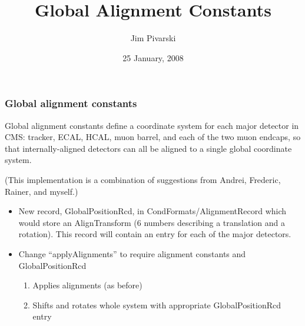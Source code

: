 \documentclass[compress]{beamer}
\title{Global Alignment Constants}
\author{Jim Pivarski}
\institute{Texas A\&M University}
\date{25 January, 2008}
\begin{document}
\frame{\titlepage}


\begin{frame}
\frametitle{Global alignment constants}

Global alignment constants define a coordinate system for each major
detector in CMS: tracker, ECAL, HCAL, muon barrel, and each of the two
muon endcaps, so that internally-aligned detectors can all be aligned
to a single global coordinate system.

\vfill
(This implementation is a combination of suggestions from Andrei, Frederic,
Rainer, and myself.)
\end{frame}

\begin{frame}
\begin{itemize}\setlength{\itemsep}{0.5 cm}
\item New record, GlobalPositionRcd, in CondFormats/AlignmentRecord which would store an AlignTransform (6 numbers describing a translation and a rotation).  This record will contain an entry for each of the major detectors.
\item Change ``applyAlignments'' to require alignment constants and GlobalPositionRcd

\vspace{0.15 cm}
\begin{enumerate}\setlength{\itemsep}{0.25 cm}
\item Applies alignments (as before)
\item Shifts and rotates whole system with appropriate GlobalPositionRcd entry
\end{enumerate}
\end{itemize}
\end{frame}
\end{document}
